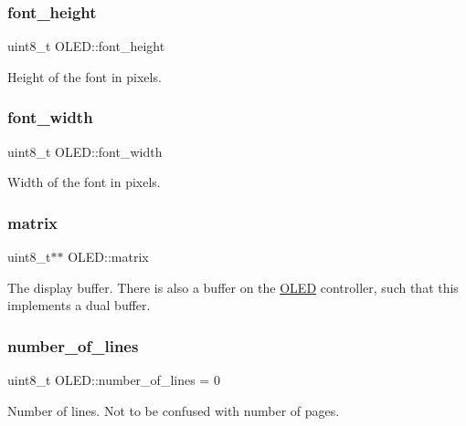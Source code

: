 \subsubsection{\texorpdfstring{font\+\_\+height}{font\_height}}
{\footnotesize\ttfamily uint8\+\_\+t O\+L\+E\+D\+::font\+\_\+height\hspace{0.3cm}{\ttfamily [protected]}}

Height of the font in pixels. \hypertarget{class_o_l_e_d_a3c9ea103adf6c860a2534135e9a25ba8}{}\label{class_o_l_e_d_a3c9ea103adf6c860a2534135e9a25ba8} 
\subsubsection{\texorpdfstring{font\+\_\+width}{font\_width}}
{\footnotesize\ttfamily uint8\+\_\+t O\+L\+E\+D\+::font\+\_\+width\hspace{0.3cm}{\ttfamily [protected]}}

Width of the font in pixels. \hypertarget{class_o_l_e_d_a9d32e21189940afba24deab0a2bc0126}{}\label{class_o_l_e_d_a9d32e21189940afba24deab0a2bc0126} 
\subsubsection{\texorpdfstring{matrix}{matrix}}
{\footnotesize\ttfamily uint8\+\_\+t$\ast$$\ast$ O\+L\+E\+D\+::matrix\hspace{0.3cm}{\ttfamily [protected]}}

The display buffer. There is also a buffer on the \hyperlink{class_o_l_e_d}{O\+L\+ED} controller, such that this implements a dual buffer. \hypertarget{class_o_l_e_d_a9ea1c55112deede1a61142af276a6bc9}{}\label{class_o_l_e_d_a9ea1c55112deede1a61142af276a6bc9} 
\subsubsection{\texorpdfstring{number\+\_\+of\+\_\+lines}{number\_of\_lines}}
{\footnotesize\ttfamily uint8\+\_\+t O\+L\+E\+D\+::number\+\_\+of\+\_\+lines = 0\hspace{0.3cm}{\ttfamily [protected]}}

Number of lines. Not to be confused with number of pages. \hypertarget{class_o_l_e_d_aaac99b0eb4e9dfe92b8571488dc89288}{}\label{class_o_l_e_d_aaac99b0eb4e9dfe92b8571488dc89288} 
